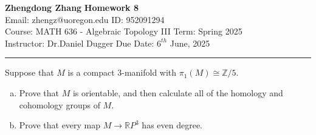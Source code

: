 \documentclass[letterpaper, 12pt]{article}
\begin{document}
\noindent
\large\textbf{Zhengdong Zhang} \hfill \textbf{Homework 8}  \\
Email: zhengz@uoregon.edu \hfill ID: 952091294  \\
\normalsize Course: MATH 636 - Algebraic Topology III \hfill Term: Spring 2025 \\
Instructor: Dr.Daniel Dugger \hfill Due Date: $6^{th}$ June, 2025  \\
\noindent\rule{7in}{2.8pt}
\begin{problem}{1}
Suppose that \(M\) is a compact 3-manifold with \(\pi_1(M)\cong \mathbb{Z}/5\). 
\begin{enumerate}[(a)]
\item Prove that \(M\) is orientable, and then calculate all of the homology and cohomology groups of \(M\). 
\item Prove that every map \(M\rightarrow \mathbb{R}P^3\) has even degree.
\end{enumerate}
\end{problem}
\end{document}

